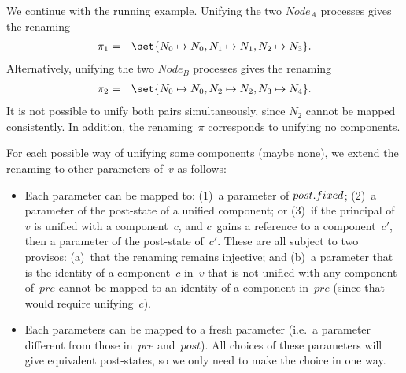 \begin{example}
We continue with the running example.  Unifying the two $Node_A$ processes
gives the renaming
\begin{eqnarray*}
\pi_1 & = & \set{N_0 \mapsto N_0, N_1 \mapsto N_1, N_2 \mapsto N_3}.
\end{eqnarray*}
Alternatively, unifying the two $Node_B$ processes gives the renaming
\begin{eqnarray*}
\pi_2 & = & \set{N_0 \mapsto N_0, N_2 \mapsto N_2, N_3 \mapsto N_4}.
\end{eqnarray*}
It is not possible to unify both pairs simultaneously, since $N_2$ cannot be
mapped consistently.
In addition, the renaming~$\pi$ corresponds to unifying no components.
\end{example}

For each possible way of unifying some components (maybe none), we extend the
renaming to other parameters of~$v$ as follows:
%
\begin{itemize}
\item  Each parameter can be mapped to:
(1)~a parameter of $post.fixed$; (2)~a parameter of the post-state of a
unified component; or (3)~if the principal of~$v$ is unified with a
component~$c$, and $c$~gains a reference to a component~$c'$, then a parameter
of the post-state of~$c'$.  These are all subject to two provisos: (a)~that
the renaming remains injective; and (b)~a parameter that is the identity
of a component~$c$ in~$v$ that is not unified with any component of~$pre$ cannot
be mapped to an identity of a component in~$pre$ (since that would require
unifying~$c$).

\item Each parameters can be mapped to a fresh parameter (i.e.~a parameter
different from those in~$pre$ and~$post$).  All choices of these parameters
will give equivalent post-states, so we only need to make the choice in one
way.
\end{itemize}


